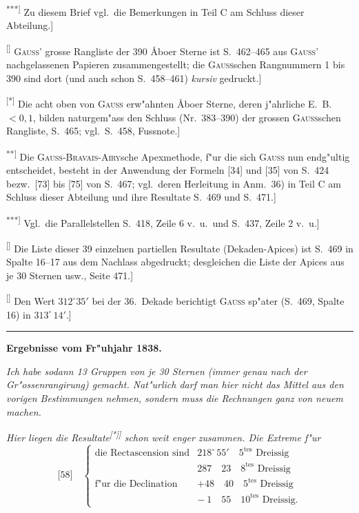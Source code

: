 \documentclass[12pt,a4paper]{article}
\theoremstyle{plain}
\theoremstyle{definition}
\theoremstyle{remark}
\begin{document}
{{\textsuperscript{***]} Zu diesem Brief vgl.\ die Bemerkungen in Teil C am Schluss dieser Abteilung.]

\textsuperscript{[\textdagger\textdagger]} \textsc{Gauss}' grosse \glq{}Rangliste\grq{} der 390 \AA{}boer Sterne ist S.\ 462--465 aus \textsc{Gauss}' nachgelassenen Papieren zusammengestellt; die \textsc{Gau\ss}schen Rangnummern 1 bis 390 sind dort (und auch schon S.\ 458--461) {\itshape kursiv} gedruckt.]

\textsuperscript{[*]} Die acht oben von \textsc{Gauss} erw"ahnten \AA{}boer Sterne, deren j"ahrliche E.\ B.\ $< 0{,}1$, bilden naturgem"ass den Schluss (Nr.\ 383--390) der grossen \textsc{Gauss}schen Rangliste, S.\ 465; vgl.\ S.\ 458, Fussnote.]

\textsuperscript{**]} Die \textsc{Gauss-Bravais-Airy}sche Apexmethode, f"ur die sich \textsc{Gauss} nun endg"ultig entscheidet, besteht in der Anwendung der Formeln [34] und [35] von S.\ 424 bezw.\ [73] bis [75] von S.\ 467; vgl.\ deren Herleitung in Anm.\ 36) in Teil C am Schluss dieser Abteilung und ihre Resultate S.\ 469 und S.\ 471.]

\textsuperscript{***]} Vgl.\ die Parallelstellen S.\ 418, Zeile 6 v.\ u.\ und S.\ 437, Zeile 2 v.\ u.]

\textsuperscript{[\textdagger]} Die Liste dieser 39 einzelnen partiellen Resultate (Dekaden-Apices) ist S.\ 469 in Spalte 16--17 aus dem Nachlass abgedruckt; desgleichen die Liste der Apices aus je 30 Sternen usw., Seite 471.]

\textsuperscript{[\textdagger\textdagger]} Den Wert $312^{\circ}35'$ bei der 36.\ Dekade berichtigt \textsc{Gauss} sp"ater (S.\ 469, Spalte 16) in $313^{\circ}\,14'$.]
}
\rule{\textwidth}{0.4pt}


\newpage
\begin{center}
\textbf{Ergebnisse vom Fr"uhjahr 1838.}
\end{center}

\noindent
{\itshape Ich habe sodann 13 Gruppen von je 30 Sternen (immer genau nach der Gr"ossenrangirung) gemacht. Nat"urlich darf man hier nicht das Mittel aus den vorigen Bestimmungen nehmen, sondern muss die Rechnungen ganz von neuem machen.}

{\itshape Hier liegen die Resultate\textsuperscript{[*]]} schon weit enger zusammen. Die Extreme f"ur}
\[
\text{[58]}\quad
\left\{\begin{array}{lll}
\text{die Rectascension sind} & 218^{\circ}\,55' \quad 5^{\text{tes}}\text{ Dreissig}\\
                               & 287\quad 23 \quad 8^{\text{tes}}\text{ Dreissig}\\
\text{f"ur die Declination} & +48\quad 40 \quad 5^{\text{tes}}\text{ Dreissig}\\
                             & -\ 1\quad 55 \quad 10^{\text{tes}}\text{ Dreissig.}
\end{array}\right.
\]

}
\end{document}
